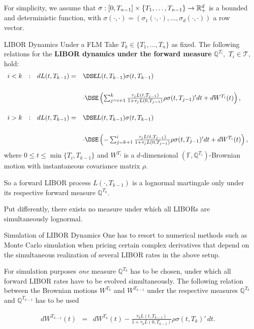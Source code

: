 	For simplicity, we assume that $\sigma: [0,T_{n-1}] \times
	\mathcal \{ T_1,\hdots,T_{n-1} \} \rightarrow \mathbb R^d_+$ is a
	bounded and deterministic function, with
	$\sigma(\cdot,\cdot)=(\sigma_1(\cdot,\cdot),\hdots,\sigma_d(\cdot,\cdot))$
	a row vector.


	LIBOR Dynamics Under a FLM
	Take $T_k \in \{T_1,\hdots,T_n\}$ as fixed.  The following relations for the {\bf LIBOR dynamics under the
	forward measure} $\mathbb Q^{T_i},$ $T_i \in \mathcal T,$ hold:
		{\tiny
		$$
		\begin{array}{llll}
		i<k &:& dL(t,T_{k-1}) = & \DSE  L(t,T_{k-1})
		\sigma(t,T_{k-1})\\*[18pt] &&&\cdot \DSE \left( \sum_{j=i+1}^k
		\frac{ \tau_j L(t,T_{j-1})}{ 1+ \tau_j L(0,T_{j-1}) } \rho
		\sigma(t, T_{j-1})' dt  + dW^{T_i}(t) \right), \\*[18pt] i>k &:&
		dL(t,T_{k-1})= & \DSE  L(t,T_{k-1}) \sigma(t,T_{k-1})\\*[18pt] &&&
		\cdot \DSE \left( -\sum_{j=k+1}^i \frac{ \tau_j L(t,T_{j-1})}{ 1+
		\tau_j L(0,T_{j-1}) } \rho \sigma(t, T_{j-1})' dt  + dW^{T_i}(t)
		\right),
		\end{array}
		$$
	where $0 \leq t \leq \min\{T_i,T_{k-1}\}$ and $W^{T_i}$ is a
	$d$-dimensional $(\mathbb F , \mathbb Q^{T_i})$-Brownian motion
	with instantaneous covariance matrix $\rho$.
	}

	So a forward LIBOR process $L(\cdot,T_{k-1})$ is a lognormal martingale only
	under its respective forward measure $\mathbb Q^{T_k}.$
	
	Put differently, there exists no measure under which all LIBORs are
	simultaneously lognormal.


Simulation of LIBOR Dynamics
	One has to resort to numerical methods such as Monte Carlo simulation when pricing
	certain complex derivatives that depend on the simultaneous
	realization of several LIBOR rates in the above setup.
	
	For simulation purposes
	{\em one} measure $\mathbb Q^{T_k}$ has to be chosen, under which
	all forward LIBOR rates have to be evolved simultaneously.
	The following
	relation between the Brownian motions $W^{T_k}$ and $W^{T_{k-1}}$
	under the respective measures $\mathbb Q^{T_k}$ and $\mathbb
	Q^{T_{k-1}}$ has to be used

	\begin{eqnarray*}
	dW^{T_{k-1}}(t) & = & dW^{T_k}(t) - \frac{\tau_k
	L(t,T_{k-1})}{1+\tau_k L(0,T_{k-1})} \rho \sigma(t,T_k)' \, dt.
	\end{eqnarray*}


